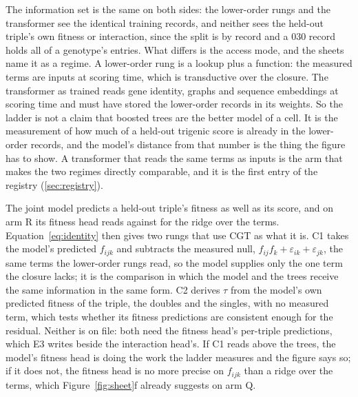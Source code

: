  The information set is the same on both
sides: the lower-order rungs and the transformer see the identical training records, and
neither sees the held-out triple's own fitness or interaction, since the split is by
record and a 030 record holds all of a genotype's entries. What differs is the access
mode, and the sheets name it as a regime. A lower-order rung is a lookup plus a function:
the measured terms are inputs at scoring time, which is transductive over the closure.
The transformer as trained reads gene identity, graphs and sequence embeddings at scoring
time and must have stored the lower-order records in its weights. So the ladder is not a
claim that boosted trees are the better model of a cell. It is the measurement of how
much of a held-out trigenic score is already in the lower-order records, and the model's
distance from that number is the thing the figure has to show. A transformer that reads
the same terms as inputs is the arm that makes the two regimes directly comparable, and
it is the first entry of the registry (\ref{sec:registry}).

 The joint model
predicts a held-out triple's fitness as well as its score, and on arm R its fitness head
reads \gfitRCgtValWindow{} against \gloRFOneridgelowerorderfitnesstest{} for the ridge
over the terms. Equation~\ref{eq:identity} then gives two rungs that use CGT as what it
is. C1 takes the model's predicted $f_{ijk}$ and subtracts the measured null,
$f_{ij} f_k + \varepsilon_{ik} + \varepsilon_{jk}$, the same terms the lower-order rungs
read, so the model supplies only the one term the closure lacks; it is the comparison in
which the model and the trees receive the same information in the same form. C2 derives
$\tau$ from the model's own predicted fitness of the triple, the doubles and the singles,
with no measured term, which tests whether its fitness predictions are consistent
enough for the residual. Neither is on file: both need the fitness head's per-triple
predictions, which E3 writes beside the interaction head's. If C1 reads above the trees,
the model's fitness head is doing the work the ladder measures and the figure says so;
if it does not, the fitness head is no more precise on $f_{ijk}$ than a ridge over the
terms, which Figure~\ref{fig:sheet}f already suggests on arm Q.

